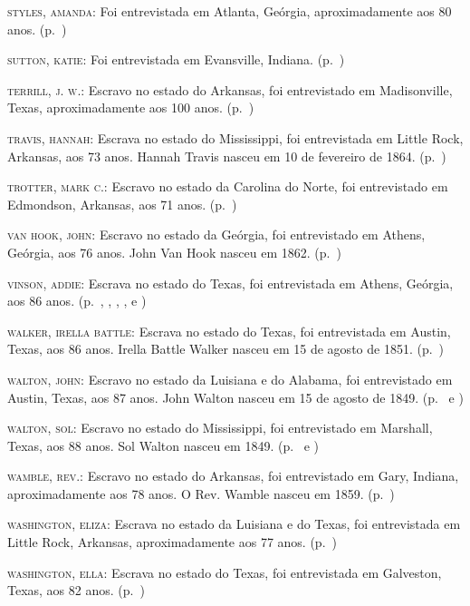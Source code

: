 \begin{Parskip}
\textsc{styles, amanda:} Foi entrevistada em Atlanta, Geórgia,
aproximadamente aos 80 anos. (p.~\pageref{ref260})

\textsc{sutton, katie:} Foi entrevistada em Evansville, Indiana. (p.~\pageref{ref261})

\textsc{terrill, j. w.:} Escravo no estado do Arkansas, foi entrevistado
em Madisonville, Texas, aproximadamente aos 100 anos. (p.~\pageref{ref262})

\textsc{travis, hannah:} Escrava no estado do Mississippi, foi
entrevistada em Little Rock, Arkansas, aos 73 anos. Hannah Travis nasceu
em 10 de fevereiro de 1864. (p.~\pageref{ref263})

\textsc{trotter, mark c.:} Escravo no estado da Carolina do Norte, foi
entrevistado em Edmondson, Arkansas, aos 71 anos. (p.~\pageref{ref264})

\textsc{van hook, john:} Escravo no estado da Geórgia, foi entrevistado
em Athens, Geórgia, aos 76 anos. John Van Hook nasceu em 1862. (p.~\pageref{ref265})

\textsc{vinson, addie:} Escrava no estado do Texas, foi entrevistada em
Athens, Geórgia, aos 86 anos. (p.~\pageref{ref266}, \pageref{ref267}, \pageref{ref268}, \pageref{ref269}, \pageref{ref270} e \pageref{ref271})

\textsc{walker, irella battle:} Escrava no estado do Texas, foi
entrevistada em Austin, Texas, aos 86 anos. Irella Battle Walker nasceu
em 15 de agosto de 1851. (p.~\pageref{ref272})

\textsc{walton, john:} Escravo no estado da Luisiana e do Alabama, foi
entrevistado em Austin, Texas, aos 87 anos. John Walton nasceu em 15 de
agosto de 1849. (p.~\pageref{ref273} e \pageref{ref274})

\textsc{walton, sol:} Escravo no estado do Mississippi, foi entrevistado
em Marshall, Texas, aos 88 anos. Sol Walton nasceu em 1849. (p.~\pageref{ref275} e \pageref{ref276})

\textsc{wamble, rev.:} Escravo no estado do Arkansas, foi entrevistado
em Gary, Indiana, aproximadamente aos 78 anos. O Rev. Wamble nasceu em
1859. (p.~\pageref{ref277})

\textsc{washington, eliza:} Escrava no estado da Luisiana e do Texas,
foi entrevistada em Little Rock, Arkansas, aproximadamente aos 77 anos. (p.~\pageref{ref278})

\textsc{washington, ella:} Escrava no estado do Texas, foi entrevistada
em Galveston, Texas, aos 82 anos. (p.~\pageref{ref279})


\end{Parskip}
